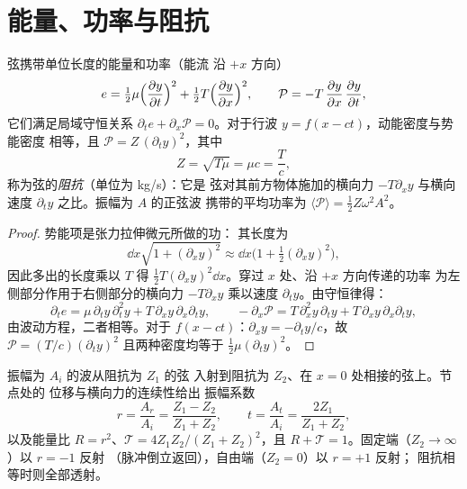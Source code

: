 \section{能量、功率与阻抗}

\begin{proposition}[弦波的能量]\label{prop:b2:waves-on-strings:energy}
弦携带单位长度的能量和功率（能流
沿 $+x$ 方向）
\[
e = \tfrac12\mu\Bigl(\frac{\partial y}{\partial t}\Bigr)^2 + \tfrac12T\Bigl(\frac{\partial y}{\partial x}\Bigr)^2 ,
\qquad
\mathcal P = -T\,\frac{\partial y}{\partial x}\,\frac{\partial y}{\partial t} ,
\]
它们满足局域守恒关系 $\partial_te + \partial_x\mathcal P = 0$。对于行波
$y = f(x - ct)$，动能密度与势能密度
相等，且 $\mathcal P = Z\,(\partial_ty)^2$，其中
\[
Z = \sqrt{T\mu} = \mu c = \frac Tc ,
\]
称为弦的\emph{阻抗}（单位为 \unit{kg/s}）：它是
弦对其前方物体施加的横向力 $-T\partial_xy$
与横向速度 $\partial_ty$ 之比。振幅为 $A$ 的正弦波
携带的平均功率为 $\langle\mathcal P\rangle = \tfrac12Z\omega^2A^2$。
\end{proposition}

\begin{proof}
势能项是张力拉伸微元所做的功：
其长度为
\[
\dd x\sqrt{1 + (\partial_xy)^2} \approx \dd x\bigl(1 + \tfrac12(\partial_xy)^2\bigr) ,
\]
因此多出的长度乘以 $T$ 得 $\tfrac12T(\partial_xy)^2\dd x$。穿过 $x$ 处、沿 $+x$ 方向传递的功率
为左侧部分作用于右侧部分的横向力
$-T\partial_xy$ 乘以速度
$\partial_ty$。由守恒律得：
\[
\partial_te = \mu\,\partial_ty\,\partial_t^2y + T\,\partial_xy\,\partial_x\partial_ty ,
\qquad
-\partial_x\mathcal P = T\,\partial_x^2y\,\partial_ty + T\,\partial_xy\,\partial_x\partial_ty ,
\]
由波动方程，二者相等。对于 $f(x - ct)$：$\partial_xy = -\partial_ty/c$，故 $\mathcal P = (T/c)
(\partial_ty)^2$ 且两种密度均等于 $\tfrac12\mu(\partial_ty)^2$。
\end{proof}

\begin{proposition}[节点处的反射与透射]\label{prop:b2:waves-on-strings:junction}
振幅为 $A_i$ 的波从阻抗为 $Z_1$ 的弦
入射到阻抗为 $Z_2$、在 $x = 0$ 处相接的弦上。节点处的
位移与横向力的连续性给出
振幅系数
\[
r = \frac{A_r}{A_i} = \frac{Z_1 - Z_2}{Z_1 + Z_2} , \qquad
t = \frac{A_t}{A_i} = \frac{2Z_1}{Z_1 + Z_2} ,
\]
以及能量比 $R = r^2$、$\mathcal T = 4Z_1Z_2/(Z_1 + Z_2)^2$，且
$R + \mathcal T = 1$。固定端（$Z_2 \to \infty$）以 $r = -1$ 反射
（脉冲倒立返回），自由端（$Z_2 = 0$）以 $r = +1$ 反射；
阻抗相等时则全部透射。
\end{proposition}

